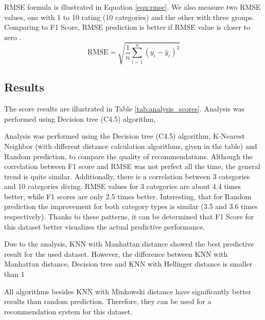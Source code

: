 RMSE formula is illustrated in Equation \eqref{equ:rmse}. We also measure two RMSE values, one with 1 to 10 rating (10 categories) and the other with three groups. Comparing to F1 Score, RMSE prediction is better if RMSE value is closer to zero \cite{RMSE}.
\begin{equation}
    \text{RMSE} = \sqrt{\frac{1}{n} \sum_{i=1}^n (y_i - \hat{y}_i)^2}\label{equ:rmse}
\end{equation}
\subsection{Results} %
The score results are illustrated in Table \ref{tab:analysis_scores}. Analysis was performed using Decision tree (C4.5) algorithm, 

Analysis was performed using the Decision tree (C4.5) algorithm, K-Nearest Neighbor (with different distance calculation algorithms, given in the table) and Random prediction, to compare the quality of recommendations. Although the correlation between F1 score and RMSE was not perfect all the time, the general trend is quite similar. Additionally, there is a correlation between 3 categories and 10 categories diving. RMSE values for 3 categories are about 4.4 times better, while F1 scores are only 2.5 times better. Interesting, that for Random prediction the improvement for both category types is similar (3.5 and 3.6 times respectively). Thanks to these patterns, it can be determined that F1 Score for this dataset better visualizes the actual predictive performance.

Due to the analysis, KNN with Manhattan distance showed the best predictive result for the used dataset. However, the difference between KNN with Manhattan distance, Decision tree and KNN with Hellinger distance is smaller than 1%

All algorithms besides KNN with Minkowski distance have significantly better results than random prediction. Therefore, they can be used for a recommendation system for this dataset.


